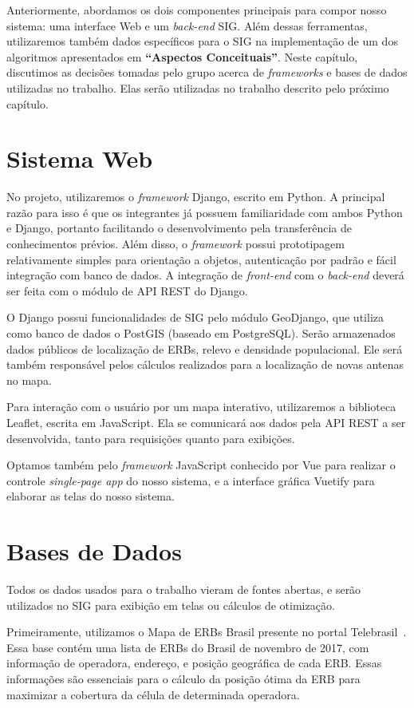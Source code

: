 \documentclass[]{politex}
\begin{document}
Anteriormente, abordamos os dois componentes principais para compor nosso
sistema: uma interface Web e um \textit{back-end} SIG. Além dessas ferramentas, utilizaremos
também dados específicos para o SIG na implementação de um dos algoritmos
apresentados em \textbf{``Aspectos Conceituais''}. Neste capítulo, discutimos as
decisões tomadas pelo grupo acerca de \emph{frameworks} e bases de dados
utilizadas no trabalho. Elas serão utilizadas no trabalho descrito pelo próximo
capítulo.

\section{Sistema Web}

No projeto, utilizaremos o \textit{framework} Django, escrito em Python. A
principal razão para isso é que os integrantes já possuem familiaridade com
ambos Python e Django, portanto facilitando o desenvolvimento pela transferência
de conhecimentos prévios. Além disso, o \textit{framework} possui prototipagem
relativamente simples para orientação a objetos, autenticação por padrão e fácil
integração com banco de dados. A integração de \textit{front-end} com o
\textit{back-end} deverá ser feita com o módulo de API REST do Django.

O Django possui funcionalidades de SIG pelo módulo GeoDjango, que utiliza como
banco de dados o PostGIS (baseado em PostgreSQL). Serão armazenados
dados públicos de localização de ERBs, relevo e densidade populacional. Ele
será também responsável pelos cálculos realizados para a localização de novas
antenas no mapa.

Para interação com o usuário por um mapa interativo, utilizaremos a biblioteca
Leaflet, escrita em JavaScript. Ela se comunicará aos dados pela API REST a ser
desenvolvida, tanto para requisições quanto para exibições.

Optamos também pelo \textit{framework} JavaScript conhecido por Vue para realizar o
controle \emph{single-page app} do nosso sistema, e a interface gráfica Vuetify
para elaborar as telas do nosso sistema.

\section{Bases de Dados}

Todos os dados usados para o trabalho vieram de fontes abertas, e
serão utilizados no SIG para exibição em telas ou cálculos de otimização.

Primeiramente, utilizamos o Mapa de ERBs Brasil presente no portal Telebrasil~\cite{mapa-erb}.
Essa base contém uma lista de ERBs do Brasil de novembro de
2017, com informação de operadora, endereço, e posição geográfica de cada ERB.
Essas informações são essenciais para o cálculo da posição ótima da ERB para
maximizar a cobertura da célula de determinada operadora.
\end{document}
